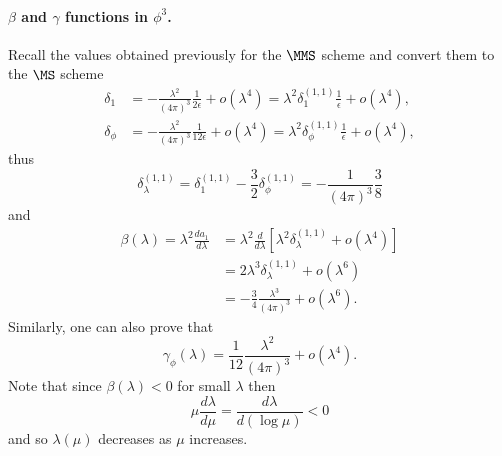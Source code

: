 \paragraph{$\beta$ and $\gamma$ functions in $\phi^3$.} Recall the values obtained previously for the $\MMS$ scheme and convert them to the $\MS$ scheme
\begin{align}
    \delta_1 &= -\frac{\lambda^2}{(4\pi)^3}\frac{1}{2\epsilon} + o(\lambda^4) = \lambda^2\delta_1^{(1,1)}\frac{1}{\epsilon} + o(\lambda^4), \\
   \delta_\phi &= -\frac{\lambda^2}{(4\pi)^3}\frac{1}{12\epsilon} + o(\lambda^4) = \lambda^2\delta_\phi^{(1,1)}\frac{1}{\epsilon} + o(\lambda^4),
\end{align}
thus
\begin{equation}
    \delta_\lambda^{(1,1)} = \delta_1^{(1,1)} - \frac{3}{2}\delta_\phi^{(1,1)} = -\frac{1}{(4\pi)^3}\frac{3}{8}
\end{equation}
and 
\begin{equation}
    \begin{split}
        \beta(\lambda) = \lambda^2\frac{d a_1}{d\lambda} &= \lambda^2\frac{d}{d\lambda}[\lambda^2\delta^{(1,1)}_\lambda + o(\lambda^4)] \\
        &= 2\lambda^3\delta^{(1,1)}_\lambda + o(\lambda^6) \\
        &= - \frac{3}{4}\frac{\lambda^3}{(4\pi)^3} + o(\lambda^6).
    \end{split}
\end{equation}
Similarly, one can also prove that 
\begin{equation}
    \gamma_\phi(\lambda) = \frac{1}{12}\frac{\lambda^2}{(4\pi)^3} + o(\lambda^4).
\end{equation}
Note that since $\beta(\lambda) < 0$ for small $\lambda$ then 
\begin{equation}
    \mu\frac{d\lambda}{d\mu} = \frac{d\lambda}{d(\log{\mu})} < 0
\end{equation}
and so $\lambda(\mu)$ decreases as $\mu$ increases.

